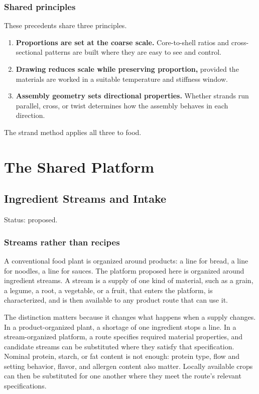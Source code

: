 \documentclass[11pt,openany]{book}
\theoremstyle{definition}
\begin{document}
\section{Shared principles}

These precedents share three principles.

\begin{enumerate}
\item \textbf{Proportions are set at the coarse scale.} Core-to-shell ratios and cross-sectional patterns are built where they are easy to see and control.
\item \textbf{Drawing reduces scale while preserving proportion,} provided the materials are worked in a suitable temperature and stiffness window.
\item \textbf{Assembly geometry sets directional properties.} Whether strands run parallel, cross, or twist determines how the assembly behaves in each direction.
\end{enumerate}

The strand method applies all three to food.

\part{The Shared Platform}

\chapter{Ingredient Streams and Intake}\label{ch:intake}

Status: proposed.

\section{Streams rather than recipes}

A conventional food plant is organized around products: a line for bread, a line for noodles, a line for sauces. The platform proposed here is organized around ingredient streams. A stream is a supply of one kind of material, such as a grain, a legume, a root, a vegetable, or a fruit, that enters the platform, is characterized, and is then available to any product route that can use it.

The distinction matters because it changes what happens when a supply changes. In a product-organized plant, a shortage of one ingredient stops a line. In a stream-organized platform, a route specifies required material properties, and candidate streams can be substituted where they satisfy that specification. Nominal protein, starch, or fat content is not enough: protein type, flow and setting behavior, flavor, and allergen content also matter. Locally available crops can then be substituted for one another where they meet the route's relevant specifications.
\end{document}
